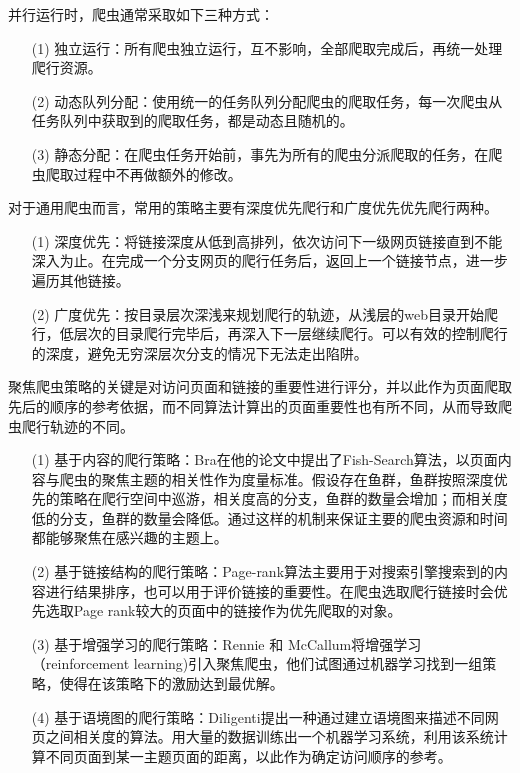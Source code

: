 \documentclass[doctor,privacy,twoside]{buaa_mac}
\begin{document}
并行运行时，爬虫通常采取如下三种方式：
\begin{itemize}
\item[(1)] 独立运行：所有爬虫独立运行，互不影响，全部爬取完成后，再统一处理爬行资源。
\item[(2)] 动态队列分配：使用统一的任务队列分配爬虫的爬取任务，每一次爬虫从任务队列中获取到的爬取任务，都是动态且随机的。
\item[(3)] 静态分配：在爬虫任务开始前，事先为所有的爬虫分派爬取的任务，在爬虫爬取过程中不再做额外的修改。
\end{itemize}

对于通用爬虫而言，常用的策略主要有深度优先爬行和广度优先优先爬行两种。
\begin{itemize}
\item[(1)] 深度优先：将链接深度从低到高排列，依次访问下一级网页链接直到不能深入为止。在完成一个分支网页的爬行任务后，返回上一个链接节点，进一步遍历其他链接。
\item[(2)] 广度优先：按目录层次深浅来规划爬行的轨迹，从浅层的web目录开始爬行，低层次的目录爬行完毕后，再深入下一层继续爬行。可以有效的控制爬行的深度，避免无穷深层次分支的情况下无法走出陷阱。
\end{itemize}

聚焦爬虫策略的关键是对访问页面和链接的重要性进行评分，并以此作为页面爬取先后的顺序的参考依据，而不同算法计算出的页面重要性也有所不同，从而导致爬虫爬行轨迹的不同。

\begin{itemize}
\item[(1)] 基于内容的爬行策略：Bra在他的论文中提出了Fish-Search算法，以页面内容与爬虫的聚焦主题的相关性作为度量标准。假设存在鱼群，鱼群按照深度优先的策略在爬行空间中巡游，相关度高的分支，鱼群的数量会增加；而相关度低的分支，鱼群的数量会降低。通过这样的机制来保证主要的爬虫资源和时间都能够聚焦在感兴趣的主题上。 
\item[(2)] 基于链接结构的爬行策略：Page-rank算法主要用于对搜索引擎搜索到的内容进行结果排序，也可以用于评价链接的重要性。在爬虫选取爬行链接时会优先选取Page rank较大的页面中的链接作为优先爬取的对象。
\item[(3)] 基于增强学习的爬行策略：Rennie 和 McCallum将增强学习（reinforcement learning)引入聚焦爬虫，他们试图通过机器学习找到一组策略，使得在该策略下的激励达到最优解。
\item[(4)] 基于语境图的爬行策略：Diligenti提出一种通过建立语境图来描述不同网页之间相关度的算法。用大量的数据训练出一个机器学习系统，利用该系统计算不同页面到某一主题页面的距离，以此作为确定访问顺序的参考。
\end{itemize}
\end{document}
